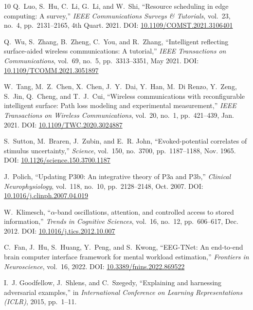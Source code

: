\documentclass[journal]{IEEEtran}
\begin{document}
\begin{thebibliography}{10}
Q.~Luo, S.~Hu, C.~Li, G.~Li, and W.~Shi, ``Resource scheduling in edge computing: A survey,'' \emph{IEEE Communications Surveys \& Tutorials}, vol.~23, no.~4, pp.~2131--2165, 4th Quart. 2021. DOI: \href{https://doi.org/10.1109/COMST.2021.3106401}{10.1109/COMST.2021.3106401}

Q.~Wu, S.~Zhang, B.~Zheng, C.~You, and R.~Zhang, ``Intelligent reflecting surface-aided wireless communications: A tutorial,'' \emph{IEEE Transactions on Communications}, vol.~69, no.~5, pp.~3313--3351, May 2021. DOI: \href{https://doi.org/10.1109/TCOMM.2021.3051897}{10.1109/TCOMM.2021.3051897}

W.~Tang, M.~Z.~Chen, X.~Chen, J.~Y.~Dai, Y.~Han, M.~Di Renzo, Y.~Zeng, S.~Jin, Q.~Cheng, and T.~J.~Cui, ``Wireless communications with reconfigurable intelligent surface: Path loss modeling and experimental measurement,'' \emph{IEEE Transactions on Wireless Communications}, vol.~20, no.~1, pp.~421--439, Jan. 2021. DOI: \href{https://doi.org/10.1109/TWC.2020.3024887}{10.1109/TWC.2020.3024887}

S.~Sutton, M.~Braren, J.~Zubin, and E.~R. John, ``Evoked-potential correlates of stimulus uncertainty,'' \emph{Science}, vol.~150, no.~3700, pp.~1187--1188, Nov. 1965. DOI: \href{https://doi.org/10.1126/science.150.3700.1187}{10.1126/science.150.3700.1187}

J.~Polich, ``Updating P300: An integrative theory of P3a and P3b,'' \emph{Clinical Neurophysiology}, vol.~118, no.~10, pp.~2128--2148, Oct. 2007. DOI: \href{https://doi.org/10.1016/j.clinph.2007.04.019}{10.1016/j.clinph.2007.04.019}

W.~Klimesch, ``$\alpha$-band oscillations, attention, and controlled access to stored information,'' \emph{Trends in Cognitive Sciences}, vol.~16, no.~12, pp.~606--617, Dec. 2012. DOI: \href{https://doi.org/10.1016/j.tics.2012.10.007}{10.1016/j.tics.2012.10.007}

C.~Fan, J.~Hu, S.~Huang, Y.~Peng, and S.~Kwong, ``EEG-TNet: An end-to-end brain computer interface framework for mental workload estimation,'' \emph{Frontiers in Neuroscience}, vol.~16, 2022. DOI: \href{https://doi.org/10.3389/fnins.2022.869522}{10.3389/fnins.2022.869522}

I.~J. Goodfellow, J.~Shlens, and C.~Szegedy, ``Explaining and harnessing adversarial examples,'' in \emph{International Conference on Learning Representations (ICLR)}, 2015, pp.~1--11.


\end{thebibliography}
\end{document}
